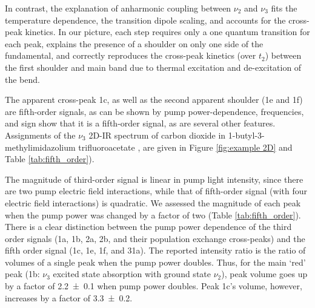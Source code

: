 In contrast, the explanation of anharmonic coupling between $\nu_2$ and $\nu_3$ fits the temperature dependence, the transition dipole scaling, and accounts for the cross-peak kinetics. In our picture, each step requires only a one quantum transition for each peak, explains the presence of a shoulder on only one side of the fundamental, and correctly reproduces the cross-peak kinetics (over $t_2$) between the first shoulder and main band due to thermal excitation and de-excitation of the bend.

The apparent cross-peak 1c, as well as the second apparent shoulder (1e and 1f) are fifth-order signals, as can be shown by pump power-dependence, frequencies, and sign show that it is a fifth-order signal, as are several other features. Assignments of the $\nu_3$ 2D-IR spectrum of carbon dioxide in 1-butyl-3-methylimidazolium trifluoroacetate \ce{[Im_{4,1}][TFA]}, are given in  Figure \ref{fig:example 2D} and Table \ref{tab:fifth_order}).

The magnitude of third-order signal is linear in pump light intensity, since there are two pump electric field interactions, while that of fifth-order signal (with four electric field interactions) is quadratic. We assessed the magnitude of each peak when the pump power was changed by a factor of two (Table \ref{tab:fifth_order}). There is a clear distinction between the pump power dependence of the third order signals (1a, 1b, 2a, 2b, and their population exchange cross-peaks) and the fifth order signal (1c, 1e, 1f, and 31a). The reported intensity ratio is the ratio of volumes of a single peak when the pump power doubles. Thus, for the main `red' peak (1b: $\nu_3$ excited state absorption with ground state $\nu_2$), peak volume goes up by a factor of \num{2.2 +- 0.1} when pump power doubles. Peak 1c's volume, however, increases by a factor of \num{3.3 +- 0.2}.

